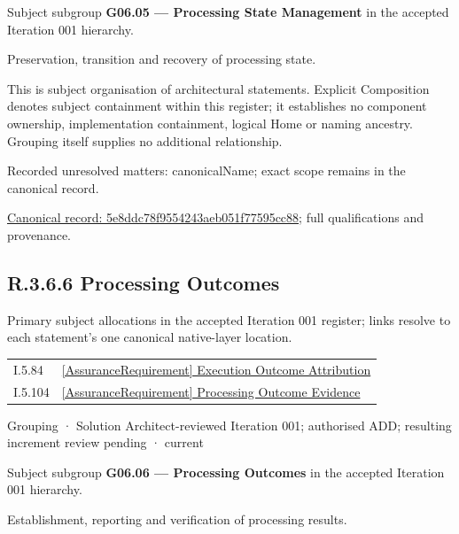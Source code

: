 Subject subgroup \textbf{G06.05 — Processing State Management} in the accepted Iteration 001 hierarchy.



Preservation, transition and recovery of processing state.



This is subject organisation of architectural statements. Explicit Composition denotes subject containment within this register; it establishes no component ownership, implementation containment, logical Home or naming ancestry. Grouping itself supplies no additional relationship.


{\small Recorded unresolved matters: canonicalName; exact scope remains in the canonical record.}\par
{\footnotesize \href{../../../../continuum/grouping/5e8ddc78f9554243aeb051f77595cc88.md}{Canonical record: 5e8ddc78f9554243aeb051f77595cc88}; full qualifications and provenance.}\par
\subsection*{R.3.6.6 Processing Outcomes}
\label{navigation:R.3.6.6}

Primary subject allocations in the accepted Iteration 001 register; links resolve to each statement’s one canonical native-layer location.\par
\begin{longtable}{p{.22\linewidth}p{.73\linewidth}}
I.5.84 & \hyperref[element:79177908b67243a4a5f86fa180f5fd22]{[AssuranceRequirement] Execution Outcome Attribution} \\
I.5.104 & \hyperref[element:8ac5880576ad4f8fa9612f231178a06c]{[AssuranceRequirement] Processing Outcome Evidence} \\
\end{longtable}
\label{element:f40da9359c7545d2ad0eef6c3a5bf645}
{\small Grouping · Solution Architect-reviewed Iteration 001; authorised ADD; resulting increment review pending · current}\par

Subject subgroup \textbf{G06.06 — Processing Outcomes} in the accepted Iteration 001 hierarchy.



Establishment, reporting and verification of processing results.



